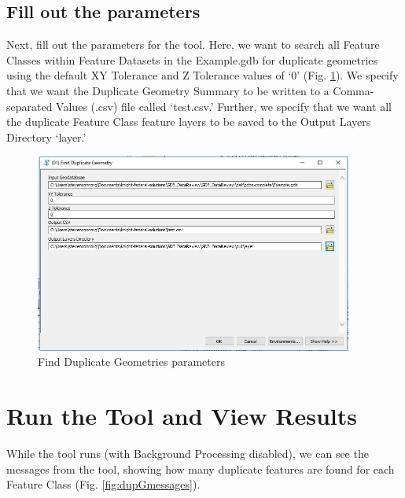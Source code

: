 \documentclass[openany]{book}
\theoremstyle{definition}
\theoremstyle{definition}
\theoremstyle{definition}
\theoremstyle{remark}
\begin{document}
\subsection{Fill out the parameters}\label{fill-out-the-parameters-3}

Next, fill out the parameters for the tool. Here, we want to search all
Feature Classes within Feature Datasets in the Example.gdb for duplicate
geometries using the default XY Tolerance and Z Tolerance values of `0'
(Fig. \ref{fig:dupGparams}). We specify that we want the Duplicate
Geometry Summary to be written to a Comma-separated Values (.csv) file
called `test.csv.' Further, we specify that we want all the duplicate
Feature Class feature layers to be saved to the Output Layers Directory
`layer.'

\begin{figure}[H]

{\centering \includegraphics[width=4.11in,]{figures/dupG-params} 

}

\caption{Find Duplicate Geometries parameters}\label{fig:dupGparams}
\end{figure}

\section{Run the Tool and View
Results}\label{run-the-tool-and-view-results-3}

While the tool runs (with Background Processing disabled), we can see
the messages from the tool, showing how many duplicate features are
found for each Feature Class (Fig. \ref{fig:dupGmessages}).
\end{document}
